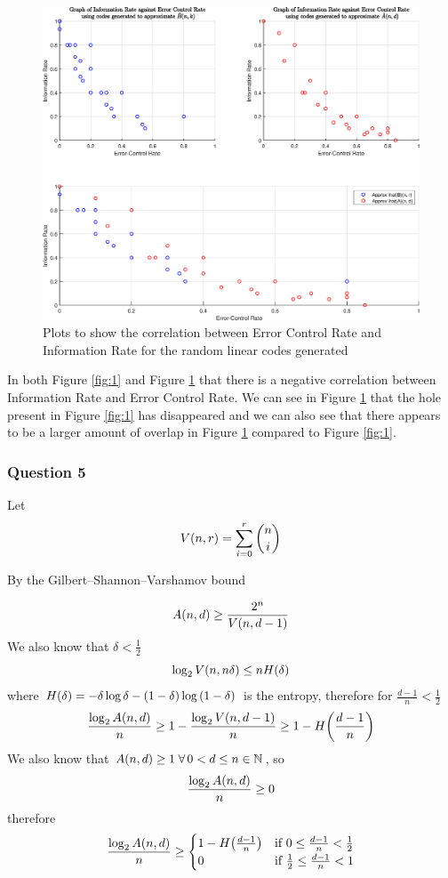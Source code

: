 \documentclass[11pt]{article} %
\let\originalleft\left
\let\originalright\right
\renewcommand{\left}{\mathopen{}\mathclose\bgroup\originalleft}
\renewcommand{\right}{\aftergroup\egroup\originalright}
\begin{document}
\begin{figure}[h]
	\centering
	\includegraphics[scale=0.6]{"../MatLab File/Q4 graph"}
	\caption{Plots to show the correlation between Error Control Rate and Information Rate for the random linear codes generated}
	\label{fig:2}
\end{figure}
In both Figure \ref{fig:1} and Figure \ref{fig:2} that there is a negative correlation between Information Rate and Error Control Rate. We can see in Figure \ref{fig:2} that the hole present in Figure \ref{fig:1} has disappeared and we can also see that there appears to be a larger amount of overlap in Figure \ref{fig:2} compared to Figure \ref{fig:1}.

\subsubsection*{Question 5}

Let
$$V\left(n,r\right) = \sum_{i=0}^{r}{\binom{n}{i}} $$

By the Gilbert–Shannon–Varshamov bound

$$ A\left(n, d\right) \geq \frac{2^n}{V\left(n,d-1\right)}$$
We also know that $\delta < \frac{1}{2}$
$$\log_2{V\left(n,n\delta\right)} \leq nH\left(\delta\right)$$
where $H\left(\delta\right) = -\delta\log{\delta}-\left(1-\delta\right)\log{\left(1-\delta\right)}$ is the entropy, therefore for $\frac{d-1}{n} < \frac{1}{2}$
$$\frac{\log_2{A\left(n, d\right)}}{n} \geq 1 - \frac{\log_2{V\left(n,d-1\right)}}{n} \geq 1 - H\left(\frac{d-1}{n}\right)$$
We also know that $A\left(n, d\right) \geq 1 \; \forall\,0 < d \leq n \in \mathbb{N}$, so
$$\frac{\log_2{A\left(n, d\right)}}{n} \geq 0 $$
therefore
\begin{equation*}
	\frac{\log_2{A\left(n, d\right)}}{n} \geq
	\begin{cases}
		1 - H\left(\frac{d-1}{n}\right) & \mbox{if } 0 \leq \frac{d-1}{n} < \frac{1}{2} \\
		0 & \mbox{if } \frac{1}{2} \leq \frac{d-1}{n} < 1
	\end{cases}
\end{equation*}
\end{document}
